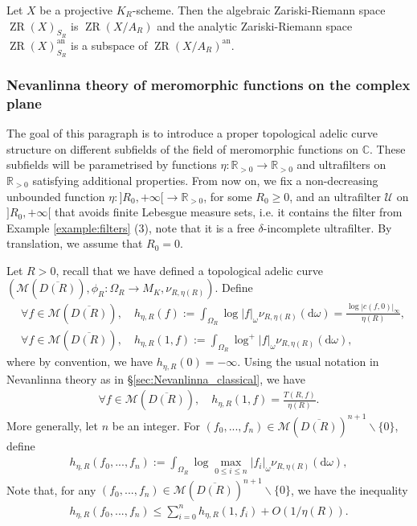 \documentclass [11pt,reqno]{amsart}
\def\bC{{\mathbb{C}}}
\def\bR{{\mathbb{R}}}
\newcommand{\1}{\mathmybb{1}}
\def\cM{{\mathcal{M}}}
\def\cU{{\mathcal{U}}}
\def\an{\operatorname{an}}
\def\diff{\mathrm{d}}
\def\ZR{\operatorname{ZR}}
\def\setminus{\smallsetminus}
\begin{document}
\begin{remark}
\label{rem:ZR_space_NEvanlinna_complex_disc}
Let $X$ be a projective $K_{R}$-scheme. Then the algebraic Zariski-Riemann space $\ZR(X)_{S_{R}}$ is $\ZR(X/A_{R})$ and the analytic Zariski-Riemann space $\ZR(X)^{\an}_{S_{R}}$ is a subspace of $\ZR(X/A_{R})^{\an}$.
\end{remark}

\subsubsection{Nevanlinna theory of meromorphic functions on the complex plane}
\label{subsub:example_tac_Nevanlinna_complex}

The goal of this paragraph is to introduce a proper topological adelic curve structure on different subfields of the field of meromorphic functions on $\bC$. These subfields will be parametrised by functions $\eta : \bR_{>0} \to \bR_{>0}$ and ultrafilters on $\bR_{>0}$ satisfying additional properties. From now on, we fix a non-decreasing unbounded function $\eta : ]R_{0},+\infty[ \to \bR_{>0}$, for some $R_{0}\geq0$, and an ultrafilter $\cU$ on $]R_{0},+\infty[$ that avoids finite Lebesgue measure sets, i.e. it contains the filter from Example \ref{example:filters} (3), note that it is a free $\delta$-incomplete ultrafilter. By translation, we assume that $R_{0}=0$.

Let $R>0$, recall that we have defined a topological adelic curve $(\cM(\overline{D(R)}),\phi_{R}:\Omega_{R}\to M_{K},\nu_{R,\eta(R)})$. Define 
\begin{align*}
&\forall f\in \cM(\overline{D(R)}), \quad h_{\eta,R}(f) := \int_{\Omega_{R}} \log|f|_{\omega} \nu_{R,\eta(R)}(\diff\omega)=\frac{\log|c(f,0)|_{\infty}}{\eta(R)},\\
&\forall f\in \cM(\overline{D(R)}), \quad h_{\eta,R}(1,f) := \int_{\Omega_{R}} \log^{+}|f|_{\omega} \nu_{R,\eta(R)}(\diff\omega),
\end{align*}
where by convention, we have $h_{\eta,R}(0)=-\infty$. Using the usual notation in Nevanlinna theory as in \S \ref{sec:Nevanlinna_classical}, we have
\begin{align*}
\forall f\in \cM(\overline{D(R)}), \quad h_{\eta,R}(1,f) = \frac{T(R,f)}{\eta(R)}.
\end{align*} 
More generally, let $n$ be an integer. For $(f_{0},...,f_{n})\in \cM(\overline{D(R)})^{n+1}\setminus\{0\}$, define
\begin{align*}
h_{\eta,R}(f_{0},...,f_{n}) := \int_{\Omega_{R}} \log\displaystyle\max_{0\leq i\leq n}|f_{i}|_{\omega} \nu_{R,\eta(R)}(\diff\omega),
\end{align*}
Note that, for any $(f_{0},...,f_{n})\in \cM(\overline{D(R)})^{n+1}\setminus\{0\}$, we have the inequality
\begin{align}
\label{eq:height_sum_eta}
h_{\eta,R}(f_{0},...,f_{n}) \leq \displaystyle\sum_{i=0}^{n} h_{\eta,R}(1,f_{i}) + O(1/\eta(R)).
\end{align} 
\end{document}
